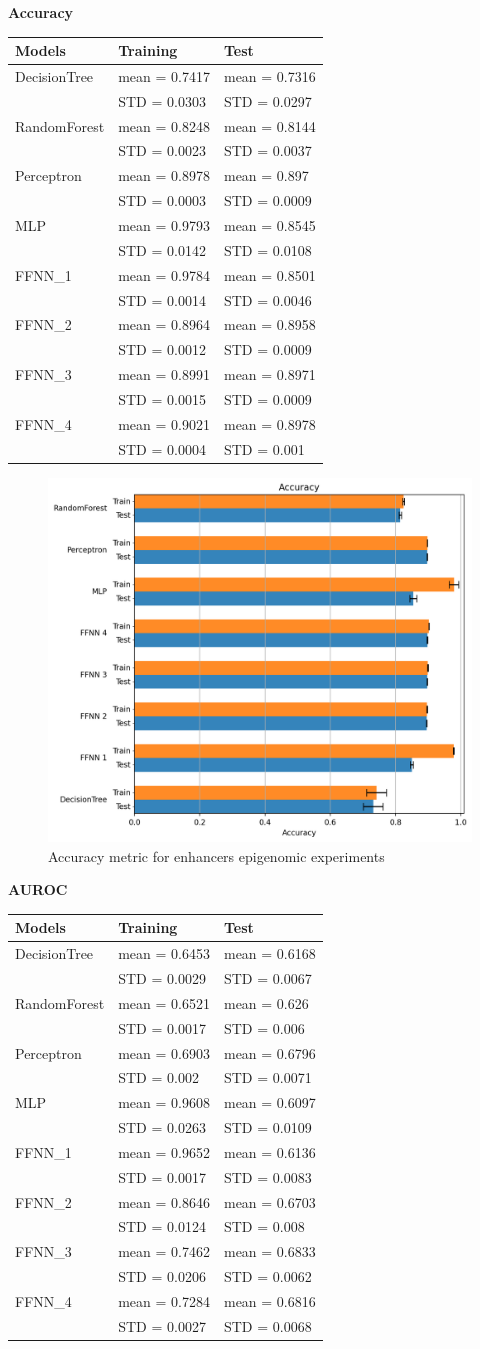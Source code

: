 \textbf{Accuracy}

\begin{longtable}[]{@{}lll@{}}
	\toprule
	\textbf{Models} & \textbf{Training} & \textbf{Test}\tabularnewline
	\midrule
	\endhead
	DecisionTree & mean = 0.7417 & mean = 0.7316\tabularnewline
	& STD = 0.0303 & STD = 0.0297\tabularnewline
	RandomForest & mean = 0.8248 & mean = 0.8144\tabularnewline
	& STD = 0.0023 & STD = 0.0037\tabularnewline
	Perceptron & mean = 0.8978 & mean = 0.897\tabularnewline
	& STD = 0.0003 & STD = 0.0009\tabularnewline
	MLP & mean = 0.9793 & mean = 0.8545\tabularnewline
	& STD = 0.0142 & STD = 0.0108\tabularnewline
	FFNN\_1 & mean = 0.9784 & mean = 0.8501\tabularnewline
	& STD = 0.0014 & STD = 0.0046\tabularnewline
	FFNN\_2 & mean = 0.8964 & mean = 0.8958\tabularnewline
	& STD = 0.0012 & STD = 0.0009\tabularnewline
	FFNN\_3 & mean = 0.8991 & mean = 0.8971\tabularnewline
	& STD = 0.0015 & STD = 0.0009\tabularnewline
	FFNN\_4 & mean = 0.9021 & mean = 0.8978\tabularnewline
	& STD = 0.0004 & STD = 0.001\tabularnewline
	\bottomrule
\end{longtable}

\begin{figure}[h!]
	\centering
	\includegraphics[width=0.6\linewidth]{../images/epigemomic_results/enhancers/accuracy.png}
	\caption{Accuracy metric for enhancers epigenomic experiments}
\end{figure}

\textbf{AUROC}

\begin{longtable}[]{@{}lll@{}}
	\toprule
	\textbf{Models} & \textbf{Training} & \textbf{Test}\tabularnewline
	\midrule
	\endhead
	DecisionTree & mean = 0.6453 & mean = 0.6168\tabularnewline
	& STD = 0.0029 & STD = 0.0067\tabularnewline
	RandomForest & mean = 0.6521 & mean = 0.626\tabularnewline
	& STD = 0.0017 & STD = 0.006\tabularnewline
	Perceptron & mean = 0.6903 & mean = 0.6796\tabularnewline
	& STD = 0.002 & STD = 0.0071\tabularnewline
	MLP & mean = 0.9608 & mean = 0.6097\tabularnewline
	& STD = 0.0263 & STD = 0.0109\tabularnewline
	FFNN\_1 & mean = 0.9652 & mean = 0.6136\tabularnewline
	& STD = 0.0017 & STD = 0.0083\tabularnewline
	FFNN\_2 & mean = 0.8646 & mean = 0.6703\tabularnewline
	& STD = 0.0124 & STD = 0.008\tabularnewline
	FFNN\_3 & mean = 0.7462 & mean = 0.6833\tabularnewline
	& STD = 0.0206 & STD = 0.0062\tabularnewline
	FFNN\_4 & mean = 0.7284 & mean = 0.6816\tabularnewline
	& STD = 0.0027 & STD = 0.0068\tabularnewline
	\bottomrule
\end{longtable}

